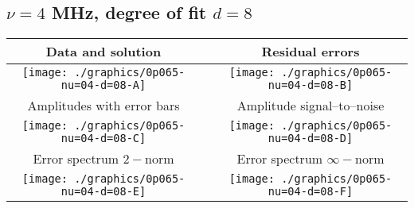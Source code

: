 

% 

\clearpage{}
\break{}

\subsection{$\nu = 4$ MHz, degree of fit $d = 8$}

\begin{table}[h]
    \begin{center}
        \begin{tabular}{ccc}
            Data and solution & \quad & Residual errors \\\hline
            \texttt{[image: ./graphics/0p065-nu=04-d=08-A]} &&
            \texttt{[image: ./graphics/0p065-nu=04-d=08-B]} \\[15pt]
            Amplitudes with error bars && Amplitude signal--to--noise \\\hline
            \texttt{[image: ./graphics/0p065-nu=04-d=08-C]} &&
            \texttt{[image: ./graphics/0p065-nu=04-d=08-D]} \\[15pt]
            Error spectrum $2-$norm && Error spectrum $\infty-$norm \\\hline
            \texttt{[image: ./graphics/0p065-nu=04-d=08-E]} &&
            \texttt{[image: ./graphics/0p065-nu=04-d=08-F]} \\[15pt]
        \end{tabular}
    \end{center}
\label{fig:elev=65, nu=4}
\end{table}



\endinput

